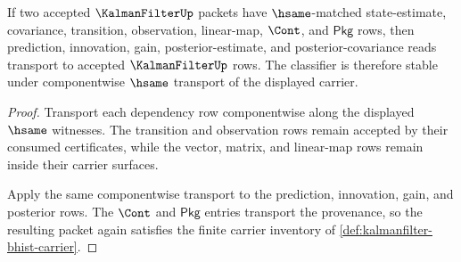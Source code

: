 \begin{theorem}
\label{thm:kalmanfilter-estimate-transport-stability}
If two accepted $\KalmanFilterUp$ packets have $\hsame$-matched state-estimate, covariance, transition, observation, linear-map, $\Cont$, and $\mathsf{Pkg}$ rows, then prediction, innovation, gain, posterior-estimate, and posterior-covariance reads transport to accepted $\KalmanFilterUp$ rows. The classifier is therefore stable under componentwise $\hsame$ transport of the displayed carrier.
\end{theorem}
\begin{proof}
Transport each dependency row componentwise along the displayed $\hsame$ witnesses. The transition and observation rows remain accepted by their consumed certificates, while the vector, matrix, and linear-map rows remain inside their carrier surfaces.

Apply the same componentwise transport to the prediction, innovation, gain, and posterior rows. The $\Cont$ and $\mathsf{Pkg}$ entries transport the provenance, so the resulting packet again satisfies the finite carrier inventory of \autoref{def:kalmanfilter-bhist-carrier}.
\end{proof}

